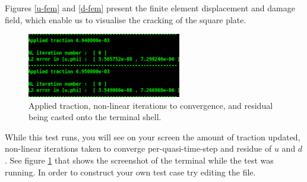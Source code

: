 Figures \ref{u-fem} and \ref{d-fem} present the finite element
displacement and damage field, which enable us to visualise the cracking
of the square plate.

\begin{figure}[h!]
\centering

\includegraphics[width=0.6\textwidth]{./Images/terminal1.png}
\caption{Applied traction, non-linear iterations to convergence, and residual being casted onto the terminal shell. \label{term}}
\end{figure}

While this test runs, you will see on your screen the amount of traction
updated, non-linear iterations taken to converge per-quasi-time-step and
residue of \(u\) and \(d\). See figure \ref{term} that shows the
screenshot of the terminal while the test was running. In order to
construct your own test case try editing the 
file.
